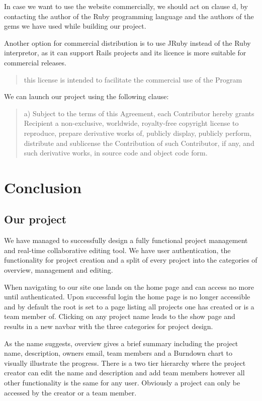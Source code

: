 \documentclass[a4wide, 11pt]{article}
\begin{document}
In case we want to use the website commercially, we should act on clause
d, by contacting the author of the Ruby programming language and the authors of
the gems we have used while building our project.

Another option for commercial distribution is to use JRuby instead of the Ruby
interpretor, as it can support Rails projects and its licence is more suitable
for commercial releases.

\begin{quote}
this license is intended to facilitate the commercial use of the Program
\cite{JRubylicence}
\end{quote}

We can launch our project using the following clause:

\begin{quote}
a) Subject to the terms of this Agreement, each Contributor hereby grants
Recipient a non-exclusive, worldwide, royalty-free copyright license to
reproduce, prepare derivative works of, publicly display, publicly perform,
distribute and sublicense the Contribution of such Contributor, if any, and
such derivative works, in source code and object code form.
\cite{JRubylicence}
\end{quote}
\clearpage

\section{Conclusion}

\subsection{Our project}
We have managed to successfully design a fully functional project management and real-time collaborative editing tool. We have user authentication, the functionality for project creation and a  split of every project into the categories of overview, management and editing. 

When navigating to our site one lands on the home page and can access no more until authenticated. Upon successful login the home page is no longer accessible and by default the root is set to a page listing all projects one has created or is a team member of. Clicking on any project name leads to the show page and results in a new navbar with the three categories for project design.

As the name suggests, overview gives a brief summary including the project name, description, owners email, team members and a Burndown chart to visually illustrate the progress. There is a two tier hierarchy where the project creator can edit the name and description and add team members however all other functionality is the same for any user. Obviously a project can only be accessed by the creator or a team member. 
\end{document}
